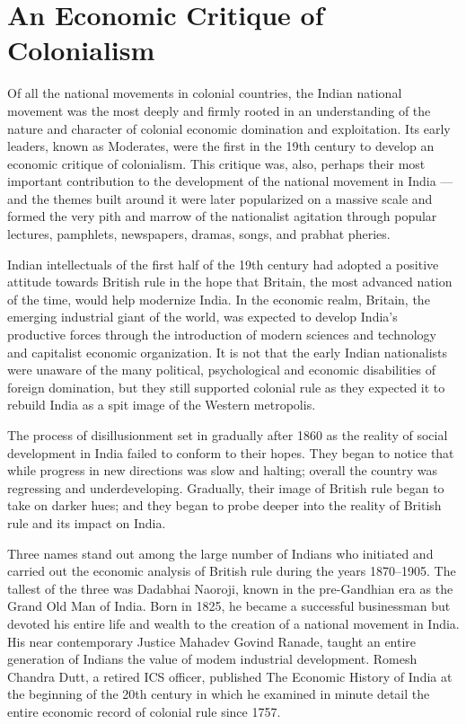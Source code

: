 
\chapter{An Economic Critique of Colonialism}

Of all the national movements in colonial countries, the Indian national movement was the most deeply and firmly rooted in an understanding of the nature and character of colonial economic domination and exploitation. Its early leaders, known as Moderates, were the first in the 19th century to develop an economic critique of colonialism. This critique was, also, perhaps their most important contribution to the development of the national movement in India --- and the themes built around it were later popularized on a massive scale and formed the very pith and marrow of the nationalist agitation through popular lectures, pamphlets, newspapers, dramas, songs, and prabhat pheries.

Indian intellectuals of the first half of the 19th century had adopted a positive attitude towards British rule in the hope that Britain, the most advanced nation of the time, would help modernize India. In the economic realm, Britain, the emerging industrial giant of the world, was expected to develop India's productive forces through the introduction of modern sciences and technology and capitalist economic organization. It is not that the early Indian nationalists were unaware of the many political, psychological and economic disabilities of foreign domination, but they still supported colonial rule as they expected it to rebuild India as a spit image of the Western metropolis.

The process of disillusionment set in gradually after 1860 as the reality of social development in India failed to conform to their hopes. They began to notice that while progress in new directions was slow and halting; overall the country was regressing and underdeveloping. Gradually, their image of British rule began to take on darker hues; and they began to probe deeper into the reality of British rule and its impact on India.

Three names stand out among the large number of Indians who initiated and carried out the economic analysis of British rule during the years 1870--1905. The tallest of the three was Dadabhai Naoroji, known in the pre-Gandhian era as the Grand Old Man of India. Born in 1825, he became a successful businessman but devoted his entire life and wealth to the creation of a national movement in India. His near contemporary Justice Mahadev Govind Ranade, taught an entire generation of Indians the value of modem industrial development. Romesh Chandra Dutt, a retired ICS officer, published The Economic History of India at the beginning of the 20th century in which he examined in minute detail the entire economic record of colonial rule since 1757.

